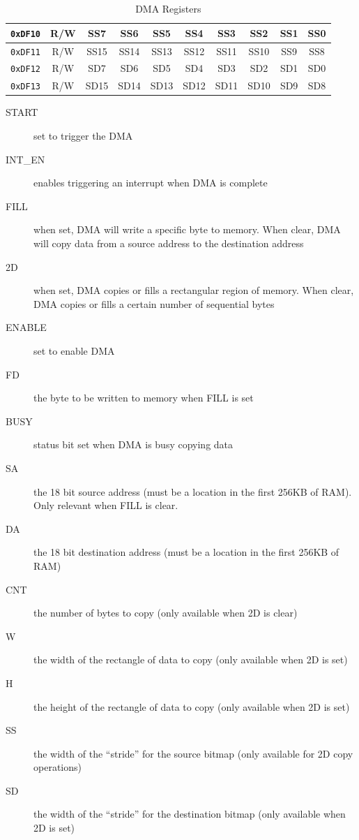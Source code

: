 \begin{table}[ht]
\begin{center}
\begin{tabular}{|c|c|c|c|c|c|c|c|c|c|}
            \verb+0xDF10+ & R/W & SS7 & SS6 & SS5 & SS4 & SS3 & SS2 & SS1 & SS0 \\ \hline
            \verb+0xDF11+ & R/W & SS15 & SS14 & SS13 & SS12 & SS11 & SS10 & SS9 & SS8 \\ \hline

            \verb+0xDF12+ & R/W & SD7 & SD6 & SD5 & SD4 & SD3 & SD2 & SD1 & SD0 \\ \hline
            \verb+0xDF13+ & R/W & SD15 & SD14 & SD13 & SD12 & SD11 & SD10 & SD9 & SD8 \\ \hline
        \end{tabular}
    \end{center}
    \caption{DMA Registers}
    \label{tab:dma_reg}
\end{table}

\begin{description}
    \item[START] set to trigger the DMA

    \item[INT\_EN] enables triggering an interrupt when DMA is complete

    \item[FILL] when set, DMA will write a specific byte to memory. When clear, DMA will copy data from a source address to the destination address

    \item[2D] when set, DMA copies or fills a rectangular region of memory. When clear, DMA copies or fills a certain number of sequential bytes

    \item[ENABLE] set to enable DMA

    \item[FD] the byte to be written to memory when FILL is set

    \item[BUSY] status bit set when DMA is busy copying data

    \item[SA] the 18 bit source address (must be a location in the first 256KB of RAM). Only relevant when FILL is clear.

    \item[DA] the 18 bit destination address (must be a location in the first 256KB of RAM)

    \item[CNT] the number of bytes to copy (only available when 2D is clear)

    \item[W] the width of the rectangle of data to copy (only available when 2D is set)

    \item[H] the height of the rectangle of data to copy (only available when 2D is set)

    \item[SS] the width of the ``stride'' for the source bitmap (only available for 2D copy operations)

    \item[SD] the width of the ``stride'' for the destination bitmap (only available when 2D is set)
\end{description}

